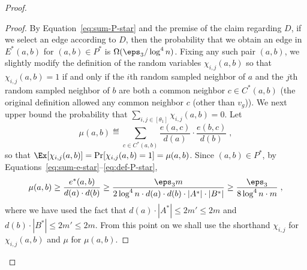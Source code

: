\begin{proof}
\begin{proof}
By Equation~\eqref{eq:sum-P-star} and the premise of the claim regarding $D$, if we select an edge according to $D$, then the probability that we obtain an edge in $E^*(a,b)$ for $(a,b)\in P^{*}$ is %
$\Omega(\eps_3/\log^4 n)$.
Fixing any such pair $(a,b)$, we slightly modify the definition of the random variables $\chi_{i,j}(a,b)$ so that $\chi_{i,j}(a,b)=1$ if and only if the $i$th random sampled neighbor of $a$ and the $j$th random sampled neighbor of $b$ are both a common neighbor $c \in C^*(a,b)$ (the original definition allowed any common neighbor $c$ (other than $v_g$)). %
We next upper bound the probability that $\sum_{i,j\in [\theta_1]}\chi_{i,j}(a,b) =0$. 
Let 
\begin{equation}\label{eq:mu-def}
\mu(a,b)\eqdef \sum_{c\in C^*(a,b)}\frac{e(a,c)}{d(a)}\cdot \frac{e(b,c)}{d(b)}\;,
\end{equation}
so that $\Ex[\chi_{i,j}(a,b)] = \Pr[\chi_{i,j}(a,b)=1] = \mu(a,b)$.
Since $(a,b)\in P^*$,
by Equations~\eqref{eq:sum-e-star}--\eqref{eq:def-P-star},
\begin{equation}\label{eq:mu-lb}
\mu(a,b) \geq \frac{e^*(a,b)}{d(a)\cdot d(b)} \geq \frac{\eps_3 m}{2\log^4 n \cdot d(a)\cdot d(b)\cdot |A^*| \cdot |B^*|} \geq \frac{\eps_3 }{8 \log^4 n \cdot m}  \;,
\end{equation}
where we have used the fact that $d(a)\cdot |A^{*}| \leq 2m' \leq 2m$ and $d(b)\cdot |B^{*}| \leq 2m' \leq 2m$. 
From this point on we shall use the shorthand $\chi_{i,j}$ for $\chi_{i,j}(a,b)$ and $\mu$ for $\mu(a,b)$.


\end{proof}
\end{proof}
